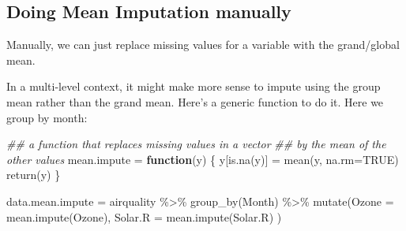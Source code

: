 \documentclass[
  letterpaper,
  DIV=11,
  numbers=noendperiod]{scrreprt}
\newenvironment{Shaded}{\begin{snugshade}}{\end{snugshade}}
\newcommand{\AttributeTok}[1]{\textcolor[rgb]{0.49,0.56,0.16}{#1}}
\newcommand{\ConstantTok}[1]{\textcolor[rgb]{0.53,0.00,0.00}{#1}}
\newcommand{\ControlFlowTok}[1]{\textcolor[rgb]{0.00,0.44,0.13}{\textbf{#1}}}
\newcommand{\DocumentationTok}[1]{\textcolor[rgb]{0.73,0.13,0.13}{\textit{#1}}}
\newcommand{\FunctionTok}[1]{\textcolor[rgb]{0.02,0.16,0.49}{#1}}
\newcommand{\NormalTok}[1]{\textcolor[rgb]{0.00,0.44,0.13}{#1}}
\newcommand{\OtherTok}[1]{\textcolor[rgb]{0.00,0.44,0.13}{#1}}
\newcommand{\SpecialCharTok}[1]{\textcolor[rgb]{0.25,0.44,0.63}{#1}}
\newcommand{\StringTok}[1]{\textcolor[rgb]{0.25,0.44,0.63}{#1}}
\begin{document}
\hypertarget{doing-mean-imputation-manually}{%
\subsection{Doing Mean Imputation
manually}\label{doing-mean-imputation-manually}}

Manually, we can just replace missing values for a variable with the
grand/global mean.

\begin{Shaded}
\end{Shaded}

In a multi-level context, it might make more sense to impute using the
group mean rather than the grand mean. Here's a generic function to do
it. Here we group by month:

\begin{Shaded}
\begin{Highlighting}[]
\DocumentationTok{\#\# a function that replaces missing values in a vector }
\DocumentationTok{\#\# by the mean of the other values}
\NormalTok{  mean.impute }\OtherTok{=} \ControlFlowTok{function}\NormalTok{(y) \{ }
\NormalTok{      y[}\FunctionTok{is.na}\NormalTok{(y)] }\OtherTok{=} \FunctionTok{mean}\NormalTok{(y, }\AttributeTok{na.rm=}\ConstantTok{TRUE}\NormalTok{)}
      \FunctionTok{return}\NormalTok{(y)}
\NormalTok{  \}}

\NormalTok{  data.mean.impute }\OtherTok{=}\NormalTok{ airquality }\SpecialCharTok{\%\textgreater{}\%} \FunctionTok{group\_by}\NormalTok{(Month) }\SpecialCharTok{\%\textgreater{}\%}
    \FunctionTok{mutate}\NormalTok{(}\AttributeTok{Ozone =} \FunctionTok{mean.impute}\NormalTok{(Ozone),}
           \AttributeTok{Solar.R =} \FunctionTok{mean.impute}\NormalTok{(Solar.R) ) }
\end{Highlighting}
\end{Shaded}
\end{document}

